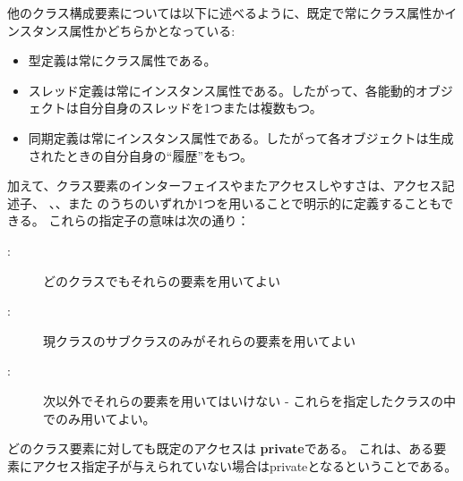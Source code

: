 \documentclass[\pformat,12pt]{jarticle}
\begin{document}
他のクラス構成要素については以下に述べるように、既定で常にクラス属性かインスタンス属性かどちらかとなっている:

\begin{itemize}
\item 型定義は常にクラス属性である。
\item スレッド定義は常にインスタンス属性である。したがって、各能動的オブジェクトは自分自身のスレッドを1つまたは複数もつ。
\item 同期定義は常にインスタンス属性である。したがって各オブジェクトは生成されたときの自分自身の``履歴''をもつ。
\end{itemize}

加えて、クラス要素のインターフェイスやまたアクセスしやすさは、アクセス記述子、 、、また のうちのいずれか1つを用いることで明示的に定義することもできる。
これらの指定子の意味は次の通り：
\begin{description}
\item[:] どのクラスでもそれらの要素を用いてよい
\item[:] 現クラスのサブクラスのみがそれらの要素を用いてよい
\item[:] 次以外でそれらの要素を用いてはいけない - これらを指定したクラスの中でのみ用いてよい。
\end{description}

どのクラス要素に対しても既定のアクセスは \textbf{private}である。
これは、ある要素にアクセス指定子が与えられていない場合はprivateとなるということである。
\end{document}
